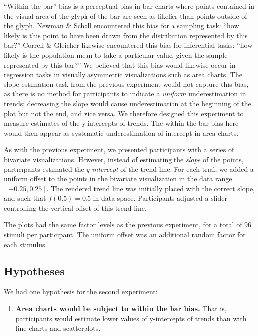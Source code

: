 \documentclass{sigchi}
\begin{document}
``Within the bar'' bias is a perceptual bias in bar charts where points contained in the visual area of the glyph of the bar are seen as likelier than points outside of the glyph. Newman \& Scholl \cite{newman2012bar} encountered this bias for a sampling task: ``how likely is this point to have been drawn from the distribution represented by this bar?'' Correll \& Gleicher \cite{correll2014error} likewise encountered this bias for inferential tasks: ``how likely is the population mean to take a particular value, given the sample represented by this bar?'' We believed that this bias would likewise occur in regression tasks in visually asymmetric visualizations such as area charts. The slope estimation task from the previous experiment would not capture this bias, as there is no method for participants to indicate a \emph{uniform} underestimation in trends; decreasing the slope would cause underestimation at the beginning of the plot but not the end, and vice versa. We therefore designed this experiment to measure estimates of the y-intercepts of trends. The within-the-bar bias here would then appear as systematic underestimation of intercept in area charts.

As with the previous experiment, we presented participants with a series of bivariate visualizations. However, instead of estimating the \emph{slope} of the points, participants estimated the \emph{y-intercept} of the trend line. For each trial, we added a uniform offset to the points in the bivariate visualization in the data range $[-0.25,0.25]$. The rendered trend line was initially placed with the correct slope, and such that $f(0.5)=0.5$ in data space. Participants adjusted a slider controlling the vertical offset of this trend line. 

The plots had the same factor levels as the previous experiment, for a total of 96 stimuli per participant. The uniform offset was an additional random factor for each stimulus. 

\subsection{Hypotheses}

We had one hypothesis for the second experiment:
\begin{enumerate}
	\item \textbf{Area charts would be subject to within the bar bias.} That is, participants would estimate lower values of y-intercepts of trends than with line charts and scatterplots. 
\end{enumerate}
\end{document}
